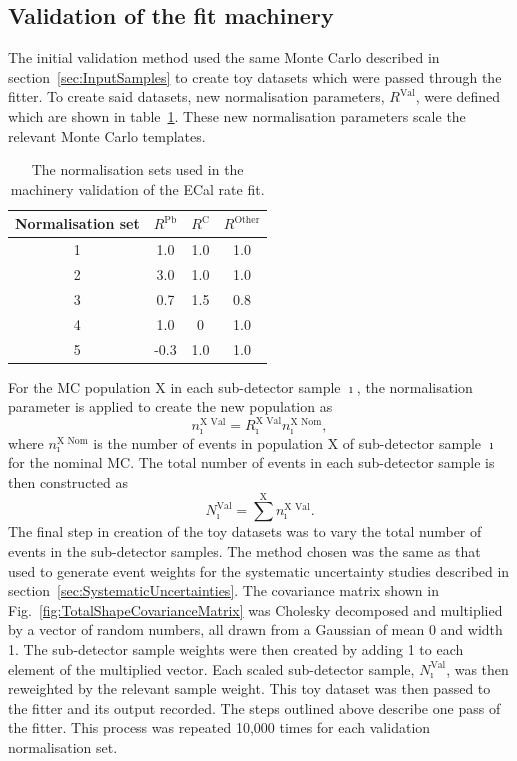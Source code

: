 \subsection{Validation of the fit machinery}
\label{subsec:FitMachineryValidation}
The initial validation method used the same Monte Carlo described in section~\ref{sec:InputSamples} to create toy datasets which were passed through the fitter.  To create said datasets, new normalisation parameters, $R^{\textrm{Val}}$, were defined which are shown in table~\ref{table:ValidationNormalizationSets}.  These new normalisation parameters scale the relevant Monte Carlo templates.  
\begin{table}
  \begin{tabular}{c | c c c }
    Normalisation set & $R^{\textrm{Pb}}$ & $R^{\textrm{C}}$ & $R^{\textrm{Other}}$\\ \hline \hline
    1 & 1.0 & 1.0 & 1.0 \\
    2 & 3.0 & 1.0 & 1.0 \\
    3 & 0.7 & 1.5 & 0.8 \\
    4 & 1.0 & 0 & 1.0 \\
    5 & -0.3 & 1.0 & 1.0 \\
  \end{tabular}
  \caption{The normalisation sets used in the machinery validation of the ECal rate fit.}
  \label{table:ValidationNormalizationSets}
\end{table}
\newline
\newline
For the MC population $\textrm{X}$ in each sub-detector sample $\imath$, the normalisation parameter is applied to create the new population as
\begin{equation}
n^{\textrm{X Val}}_{\imath} = R^{\textrm{X Val}}_{\imath} n^{\textrm{X Nom}}_{\imath},
\label{eq:ValidationScaledPopulation}
\end{equation}
where $n^{\textrm{X Nom}}_{\imath}$ is the number of events in population $\textrm{X}$ of sub-detector sample $\imath$ for the nominal MC.  The total number of events in each sub-detector sample is then constructed as 
\begin{equation}
N^{\textrm{Val}}_{\imath} = \sum^{\textrm{X}} n^{\textrm{X Val}}_{\imath}.
\label{eq:ValidationNEventsDetector}
\end{equation}
The final step in creation of the toy datasets was to vary the total number of events in the sub-detector samples.  The method chosen was the same as that used to generate event weights for the systematic uncertainty studies described in section~\ref{sec:SystematicUncertainties}.  The covariance matrix shown in Fig.~\ref{fig:TotalShapeCovarianceMatrix} was Cholesky decomposed and multiplied by a vector of random numbers, all drawn from a Gaussian of mean 0 and width 1.  The sub-detector sample weights were then created by adding 1 to each element of the multiplied vector.  Each scaled sub-detector sample, $N^{\textrm{Val}}_{\imath}$, was then reweighted by the relevant sample weight.  This toy dataset was then passed to the fitter and its output recorded.  The steps outlined above describe one pass of the fitter.  This process was repeated 10,000 times for each validation normalisation set.

